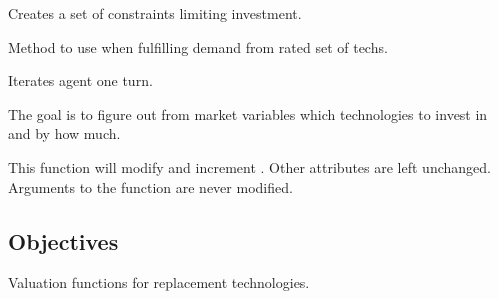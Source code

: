 \documentclass[letterpaper,10pt,english]{sphinxmanual}
\begin{document}
\begin{fulllineitems}
\begin{fulllineitems}
\label{\detokenize{api:muse.agents.agent.InvestingAgent.constraints}}
Creates a set of constraints limiting investment.

\end{fulllineitems}


\begin{fulllineitems}
\label{\detokenize{api:muse.agents.agent.InvestingAgent.invest}}
Method to use when fulfilling demand from rated set of techs.

\end{fulllineitems}


\begin{fulllineitems}
\label{\detokenize{api:muse.agents.agent.InvestingAgent.next}}
Iterates agent one turn.

The goal is to figure out from market variables which technologies to
invest in and by how much.

This function will modify  and increment .
Other attributes are left unchanged. Arguments to the function are
never modified.

\end{fulllineitems}


\end{fulllineitems}



\subsection{Objectives}
\label{\detokenize{api:module-muse.objectives}}\label{\detokenize{api:objectives}}
Valuation functions for replacement technologies.
\end{document}
